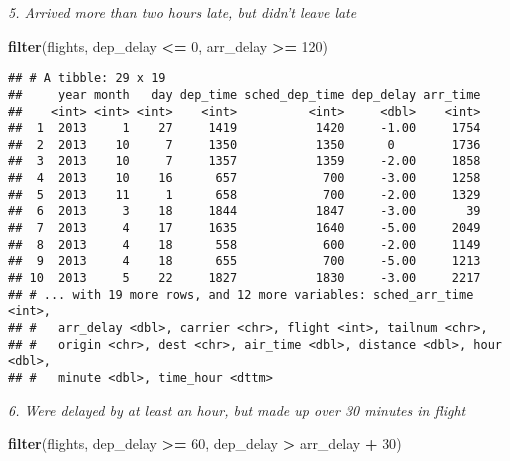 \documentclass[]{article}
\newenvironment{Shaded}{\begin{snugshade}}{\end{snugshade}}
\newcommand{\KeywordTok}[1]{\textcolor[rgb]{0.13,0.29,0.53}{\textbf{#1}}}
\newcommand{\DecValTok}[1]{\textcolor[rgb]{0.00,0.00,0.81}{#1}}
\newcommand{\StringTok}[1]{\textcolor[rgb]{0.31,0.60,0.02}{#1}}
\newcommand{\OperatorTok}[1]{\textcolor[rgb]{0.81,0.36,0.00}{\textbf{#1}}}
\newcommand{\NormalTok}[1]{#1}
\theoremstyle{definition}
\theoremstyle{definition}
\theoremstyle{definition}
\theoremstyle{remark}
\begin{document}
\emph{5. Arrived more than two hours late, but didn't leave late}

\begin{Shaded}
\begin{Highlighting}[]
\KeywordTok{filter}\NormalTok{(flights, dep_delay }\OperatorTok{<=}\StringTok{ }\DecValTok{0}\NormalTok{, arr_delay }\OperatorTok{>=}\StringTok{ }\DecValTok{120}\NormalTok{)}
\end{Highlighting}
\end{Shaded}

\begin{verbatim}
## # A tibble: 29 x 19
##     year month   day dep_time sched_dep_time dep_delay arr_time
##    <int> <int> <int>    <int>          <int>     <dbl>    <int>
##  1  2013     1    27     1419           1420     -1.00     1754
##  2  2013    10     7     1350           1350      0        1736
##  3  2013    10     7     1357           1359     -2.00     1858
##  4  2013    10    16      657            700     -3.00     1258
##  5  2013    11     1      658            700     -2.00     1329
##  6  2013     3    18     1844           1847     -3.00       39
##  7  2013     4    17     1635           1640     -5.00     2049
##  8  2013     4    18      558            600     -2.00     1149
##  9  2013     4    18      655            700     -5.00     1213
## 10  2013     5    22     1827           1830     -3.00     2217
## # ... with 19 more rows, and 12 more variables: sched_arr_time <int>,
## #   arr_delay <dbl>, carrier <chr>, flight <int>, tailnum <chr>,
## #   origin <chr>, dest <chr>, air_time <dbl>, distance <dbl>, hour <dbl>,
## #   minute <dbl>, time_hour <dttm>
\end{verbatim}

\emph{6. Were delayed by at least an hour, but made up over 30 minutes
in flight}

\begin{Shaded}
\begin{Highlighting}[]
\KeywordTok{filter}\NormalTok{(flights, dep_delay }\OperatorTok{>=}\StringTok{ }\DecValTok{60}\NormalTok{, dep_delay }\OperatorTok{>}\StringTok{ }\NormalTok{arr_delay }\OperatorTok{+}\StringTok{ }\DecValTok{30}\NormalTok{)}
\end{Highlighting}
\end{Shaded}
\end{document}
